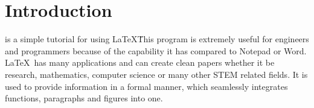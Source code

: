 \documentclass[12pt,journal,compsoc]{IEEEtran}
\begin{document}
\section{Introduction}
%
%



% 
% 
% 
% 

 is a simple tutorial for using \LaTeX\. This program is extremely useful for engineers and programmers because of the capability it has compared to Notepad or Word. 
\LaTeX\ has many applications and can create clean papers whether it be research, mathematics, computer science or many other STEM related fields. It is used to provide information in a formal manner, which seamlessly integrates functions, paragraphs and figures into one. 
 
\end{document}
